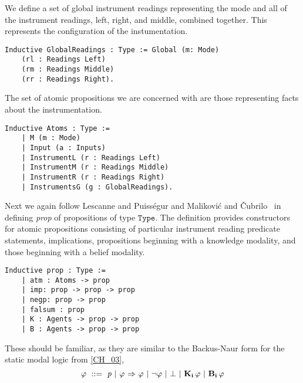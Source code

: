 We define a set of global instrument readings representing the mode and all of the instrument readings, left, right, and middle, combined together. This represents the configuration of the instumentation.


\begin{tcolorbox}
	\begin{lstlisting}[language=Coq]
	Inductive GlobalReadings : Type := Global (m: Mode) 
	(rl : Readings Left) 
	(rm : Readings Middle) 
	(rr : Readings Right). 
	\end{lstlisting}
\end{tcolorbox}

The set of atomic propositions we are concerned with are those representing facts about the instrumentation.


\begin{tcolorbox}
	\begin{lstlisting}[language=Coq]
	Inductive Atoms : Type := 
	| M (m : Mode)
	| Input (a : Inputs) 
	| InstrumentL (r : Readings Left) 
	| InstrumentM (r : Readings Middle) 
	| InstrumentR (r : Readings Right)
	| InstrumentsG (g : GlobalReadings).
	\end{lstlisting}
\end{tcolorbox}

Next we  again follow Lescanne and Puiss\'egur \cite{lescanne, puislescanne} and Malikovi\'c and \v Cubrilo~\cite{delcoq1,delcoq2} in defining \emph{prop} of propositions of type $\mathtt{Type}$. The definition provides constructors for atomic propositions consisting of particular instrument reading predicate statements, implications, propositions beginning with a knowledge modality, and those beginning with a belief modality.

\begin{tcolorbox}
	\begin{lstlisting}[language=Coq]	
	Inductive prop : Type :=
	| atm : Atoms -> prop
	| imp: prop -> prop -> prop
	| negp: prop -> prop
	| falsum : prop
	| K : Agents -> prop -> prop
	| B : Agents -> prop -> prop
	\end{lstlisting}
\end{tcolorbox}

These should be familiar, as they are similar to the Backus-Naur form for the static modal logic from \ref{CH_03}, 
	$$ \varphi \ ::=\   \mathit{p} \ |\  \varphi {\ \Rightarrow \ } \varphi \ |\  {\neg} \varphi \ |\  \bot  \ |\  \mathbf{K}_{\mathbf{i}}\, \varphi \ |\  \mathbf{B}_{\mathbf{i}}\,\varphi $$

